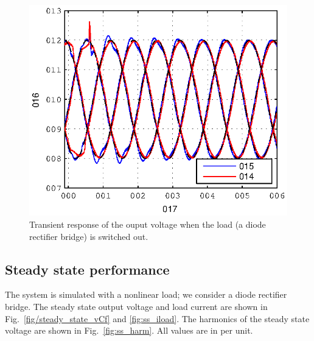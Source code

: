 \documentclass[conference,10pt]{IEEEtran}
\begin{document}
\begin{figure}[!h]
\centering

\includegraphics{fig/transient_vCf}
\caption{Transient response of the ouput voltage when the load (a diode rectifier bridge) is switched out.}
\label{fig:trans_vc}
\end{figure}


\subsection{Steady state performance}
The system is simulated with a nonlinear load; we consider a diode rectifier bridge. The steady state output voltage and load current are shown in Fig.~\ref{fig/steady_state_vCf} and
\ref{fig:ss_iload}. The harmonics of the steady state voltage are shown in Fig.~\ref{fig:ss_harm}. All values are in per unit.
\end{document}

